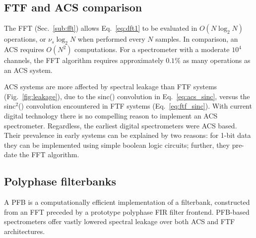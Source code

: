 \documentclass{ws-rv961x669}
\begin{document}



\subsection{FTF and ACS comparison}\label{sub:ftf}

The FFT (Sec.~\ref{sub:fft}) allows Eq.~\ref{eq:dft1} to be evaluated in $O(N\log_2N)$ operations, or $\nu_s\log_2N$ when performed every $N$ samples. In comparison, an ACS requires $O(N^2)$ computations. For a spectrometer with a moderate $10^4$ channels, the FFT algorithm requires approximately $0.1\%$ as many operations as an ACS system.
 
ACS systems are more affected by spectral leakage than FTF systems (Fig.~\ref{fig:leakage}), due to the sinc() convolution in Eq.~\ref{eq:acs_sinc}, versus the sinc$^2$() convolution encountered in FTF systems (Eq.~\ref{eq:ftf_sinc}). With current digital technology there is no compelling reason to implement an ACS spectrometer. Regardless, the earliest digital spectrometers were ACS based. Their prevalence in early systems can be explained by two reasons: for 1-bit data they can be implemented using simple boolean logic circuits; further, they pre-date the FFT algorithm.  
 
\subsection{Polyphase filterbanks}\label{sub:pfb}

A PFB is a computationally efficient implementation of a filterbank, constructed from an FFT preceded by a prototype polyphase FIR filter frontend.\citet{Schafer1973, Bellanger:1976p7898,  Harris2011} PFB-based spectrometers offer vastly lowered spectral leakage over both ACS and FTF architectures. 
\end{document}

